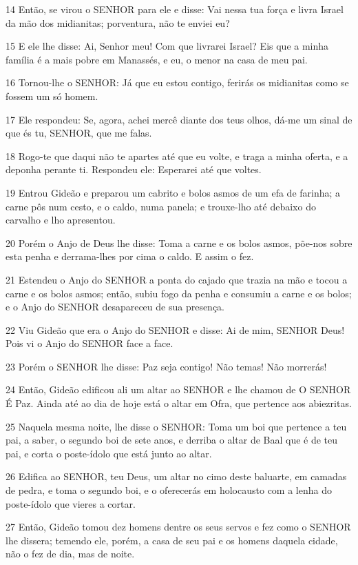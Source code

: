 \par 14 Então, se virou o SENHOR para ele e disse: Vai nessa tua força e livra Israel da mão dos midianitas; porventura, não te enviei eu?
\par 15 E ele lhe disse: Ai, Senhor meu! Com que livrarei Israel? Eis que a minha família é a mais pobre em Manassés, e eu, o menor na casa de meu pai.
\par 16 Tornou-lhe o SENHOR: Já que eu estou contigo, ferirás os midianitas como se fossem um só homem.
\par 17 Ele respondeu: Se, agora, achei mercê diante dos teus olhos, dá-me um sinal de que és tu, SENHOR, que me falas.
\par 18 Rogo-te que daqui não te apartes até que eu volte, e traga a minha oferta, e a deponha perante ti. Respondeu ele: Esperarei até que voltes.
\par 19 Entrou Gideão e preparou um cabrito e bolos asmos de um efa de farinha; a carne pôs num cesto, e o caldo, numa panela; e trouxe-lho até debaixo do carvalho e lho apresentou.
\par 20 Porém o Anjo de Deus lhe disse: Toma a carne e os bolos asmos, põe-nos sobre esta penha e derrama-lhes por cima o caldo. E assim o fez.
\par 21 Estendeu o Anjo do SENHOR a ponta do cajado que trazia na mão e tocou a carne e os bolos asmos; então, subiu fogo da penha e consumiu a carne e os bolos; e o Anjo do SENHOR desapareceu de sua presença.
\par 22 Viu Gideão que era o Anjo do SENHOR e disse: Ai de mim, SENHOR Deus! Pois vi o Anjo do SENHOR face a face.
\par 23 Porém o SENHOR lhe disse: Paz seja contigo! Não temas! Não morrerás!
\par 24 Então, Gideão edificou ali um altar ao SENHOR e lhe chamou de O SENHOR É Paz. Ainda até ao dia de hoje está o altar em Ofra, que pertence aos abiezritas.
\par 25 Naquela mesma noite, lhe disse o SENHOR: Toma um boi que pertence a teu pai, a saber, o segundo boi de sete anos, e derriba o altar de Baal que é de teu pai, e corta o poste-ídolo que está junto ao altar.
\par 26 Edifica ao SENHOR, teu Deus, um altar no cimo deste baluarte, em camadas de pedra, e toma o segundo boi, e o oferecerás em holocausto com a lenha do poste-ídolo que vieres a cortar.
\par 27 Então, Gideão tomou dez homens dentre os seus servos e fez como o SENHOR lhe dissera; temendo ele, porém, a casa de seu pai e os homens daquela cidade, não o fez de dia, mas de noite.
